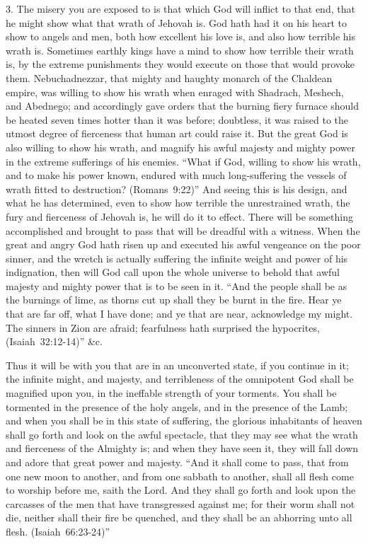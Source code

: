 \documentclass[
]{book}
\begin{document}
3. The misery you are exposed to is that which God will inflict to that end, that he might show what that wrath of Jehovah is. God hath had it on his heart to show to angels and men, both how excellent his love is, and also how terrible his wrath is. Sometimes earthly kings have a mind to show how terrible their wrath is, by the extreme punishments they would execute on those that would provoke them. Nebuchadnezzar, that mighty and haughty monarch of the Chaldean empire, was willing to show his wrath when enraged with Shadrach, Meshech, and Abednego; and accordingly gave orders that the burning fiery furnace should be heated seven times hotter than it was before; doubtless, it was raised to the utmost degree of fierceness that human art could raise it. But the great God is also willing to show his wrath, and magnify his awful majesty and mighty power in the extreme sufferings of his enemies. ``What if God, willing to show his wrath, and to make his power known, endured with much long-suffering the vessels of wrath fitted to destruction? (Romans~9:22)'' And seeing this is his design, and what he has determined, even to show how terrible the unrestrained wrath, the fury and fierceness of Jehovah is, he will do it to effect. There will be something accomplished and brought to pass that will be dreadful with a witness. When the great and angry God hath risen up and executed his awful vengeance on the poor sinner, and the wretch is actually suffering the infinite weight and power of his indignation, then will God call upon the whole universe to behold that awful majesty and mighty power that is to be seen in it. ``And the people shall be as the burnings of lime, as thorns cut up shall they be burnt in the fire. Hear ye that are far off, what I have done; and ye that are near, acknowledge my might. The sinners in Zion are afraid; fearfulness hath surprised the hypocrites, (Isaiah~32:12-14)'' \&c.

Thus it will be with you that are in an unconverted state, if you continue in it; the infinite might, and majesty, and terribleness of the omnipotent God shall be magnified upon you, in the ineffable strength of your torments. You shall be tormented in the presence of the holy angels, and in the presence of the Lamb; and when you shall be in this state of suffering, the glorious inhabitants of heaven shall go forth and look on the awful spectacle, that they may see what the wrath and fierceness of the Almighty is; and when they have seen it, they will fall down and adore that great power and majesty. ``And it shall come to pass, that from one new moon to another, and from one sabbath to another, shall all flesh come to worship before me, saith the Lord. And they shall go forth and look upon the carcasses of the men that have transgressed against me; for their worm shall not die, neither shall their fire be quenched, and they shall be an abhorring unto all flesh. (Isaiah~66:23-24)''
\end{document}
